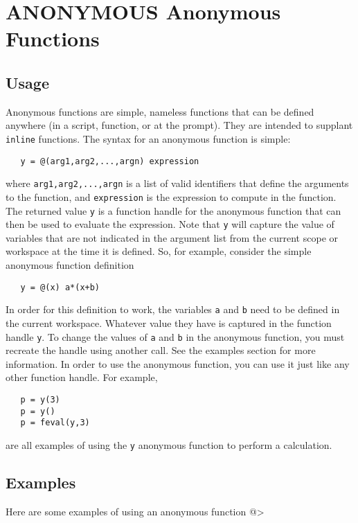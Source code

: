 \section{ANONYMOUS Anonymous Functions}

\subsection{Usage}

Anonymous functions are simple, nameless functions that can be defined
anywhere (in a script, function, or at the prompt).  They are intended
to supplant \verb|inline| functions.  The syntax for an anonymous function
is simple:
\begin{verbatim}
   y = @(arg1,arg2,...,argn) expression
\end{verbatim}
where \verb|arg1,arg2,...,argn| is a list of valid identifiers that define
the arguments to the function, and \verb|expression| is the expression to
compute in the function.  The returned value \verb|y| is a function handle
for the anonymous function that can then be used to evaluate the expression.
Note that \verb|y| will capture the value of variables that are not indicated
in the argument list from the current scope or workspace at the time
it is defined.  So, for example, consider the simple anonymous function
definition
\begin{verbatim}
   y = @(x) a*(x+b)
\end{verbatim}
In order for this definition to work, the variables \verb|a| and \verb|b| need to
be defined in the current workspace.  Whatever value they have is captured
in the function handle \verb|y|.  To change the values of \verb|a| and \verb|b| in the
anonymous function, you must recreate the handle using another call.  See
the examples section for more information.  In order to use the anonymous
function, you can use it just like any other function handle.  For example,
\begin{verbatim}
   p = y(3)
   p = y()
   p = feval(y,3)
\end{verbatim}
are all examples of using the \verb|y| anonymous function to perform a calculation.
\subsection{Examples}

Here are some examples of using an anonymous function
@>
